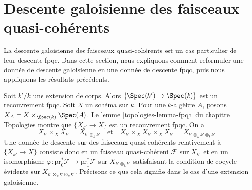 \section{Descente galoisienne des faisceaux quasi-cohérents}
\label{section-galois-descent}

\noindent
La descente galoisienne des faisceaux quasi-cohérents est un cas particulier
de leur descente fpqc. Dans cette section, nous expliquons comment
reformuler une donnée de descente galoisienne en une donnée de descente fpqc,
puis nous appliquons les résultats précédents.

\medskip\noindent
Soit $k'/k$ une extension de corps. Alors $\{\Spec(k') \to \Spec(k)\}$
est un recouvrement fpqc. Soit $X$ un schéma sur $k$.
Pour une $k$-algèbre $A$, posons $X_A = X \times_{\Spec(k)} \Spec(A)$.
Le lemme \ref{topologies-lemma-fpqc} du chapitre Topologies montre que
$\{X_{k'} \to X\}$ est un recouvrement fpqc. On a
$$
X_{k'} \times_X X_{k'} = X_{k' \otimes_k k'}
\quad\text{et}\quad
X_{k'} \times_X X_{k'} \times_X X_{k'} = X_{k' \otimes_k k' \otimes_k k'}
$$
Une donnée de descente sur des faisceaux quasi-cohérents relativement à
$\{X_{k'} \to X\}$ consiste donc en un faisceau quasi-cohérent $\mathcal{F}$
sur $X_{k'}$ et en un isomorphisme
$\varphi : \text{pr}_0^*\mathcal{F} \to \text{pr}_1^*\mathcal{F}$
sur $X_{k' \otimes_k k'}$ satisfaisant la condition de cocycle évidente
sur $X_{k' \otimes_k k' \otimes_k k'}$.
Précisons ce que cela signifie dans le cas d'une extension galoisienne.

